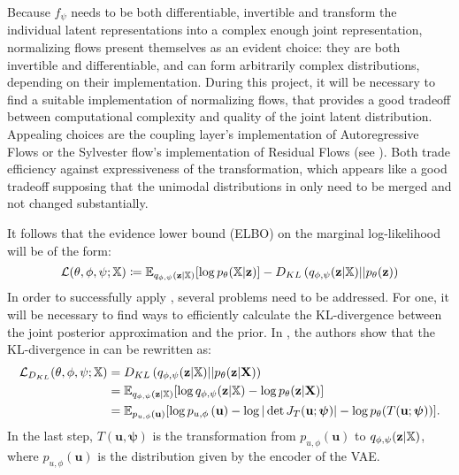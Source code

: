 \documentclass[english]{scrartcl}
\begin{document}
    Because $f_{\psi}$ needs to be both differentiable, invertible and transform the individual latent representations into a complex enough joint representation, normalizing flows present themselves as an evident choice:
    they are both invertible and differentiable, and can form arbitrarily complex distributions, depending on their implementation.
    During this project, it will be necessary to find a suitable implementation of normalizing flows, that provides a good tradeoff between computational complexity and quality of the joint latent distribution.
    Appealing choices are the coupling layer's implementation of Autoregressive Flows or the Sylvester flow's implementation of Residual Flows (see ).
    Both trade efficiency against expressiveness of the transformation, which appears like a good tradeoff supposing that the unimodal distributions in  only need to be merged and not changed substantially.

    It follows that the evidence lower bound (ELBO) on the marginal log-likelihood will be of the form:
    \begin{equation}
        \label{eq:elbo}
        \mathcal{L}(\theta, \phi, \psi; \mathbb{X}) \coloneqq \mathbb{E}_{q_{\phi, \psi}(\textbf{z}|\mathbb{X})}[\log p_{\theta}(\mathbb{X}|\textbf{z})] - D_{KL} \left( q_{\phi, \psi}(\textbf{z}|\mathbb{X}) ||p_{\theta}(\textbf{z})\right)
    \end{equation}
    In order to successfully apply , several problems need to be addressed.
    For one, it will be necessary to find ways to efficiently calculate the KL-divergence between the joint posterior approximation and the prior.
    In \citet{papamakarios_normalizing_2019}, the authors show that the KL-divergence in  can be rewritten as:
    \begin{equation}
        \label{eq:Dkl}
        \begin{split}
            \mathcal{L}_{D_{KL}}(\theta, \phi, \psi; \mathbb{X}) & =D_{KL} \left( q_{\phi, \psi}(\textbf{z}|\mathbb{X}) || p_{\theta}(\textbf{z}|\textbf{X}) \right)\\
            & = \mathbb{E}_{q_{\phi, \psi}(\textbf{z}|\mathbb{X})}[\log q_{\phi, \psi}(\textbf{z}|\mathbb{X}) - \log p_{\theta}(\textbf{z}|\textbf{X})]\\
            & = \mathbb{E}_{p_{u,\phi}(\textbf{u})}[\log p_{u,\phi} \left(\textbf{u} \right) - \log |\det J_{T}(\textbf{u}; \boldsymbol{\psi})|- \log p_{\theta}(T(\textbf{u}; \boldsymbol{\psi}))].
        \end{split}
    \end{equation}
    In the last step, $T(\textbf{u},\boldsymbol{\psi})$ is the transformation from $p_{u,\phi}(\textbf{u})$ to $q_{\phi, \psi}(\textbf{z}|\mathbb{X})$, where $p_{u,\phi}(\textbf{u})$ is the distribution given by the encoder of the VAE.
\end{document}
